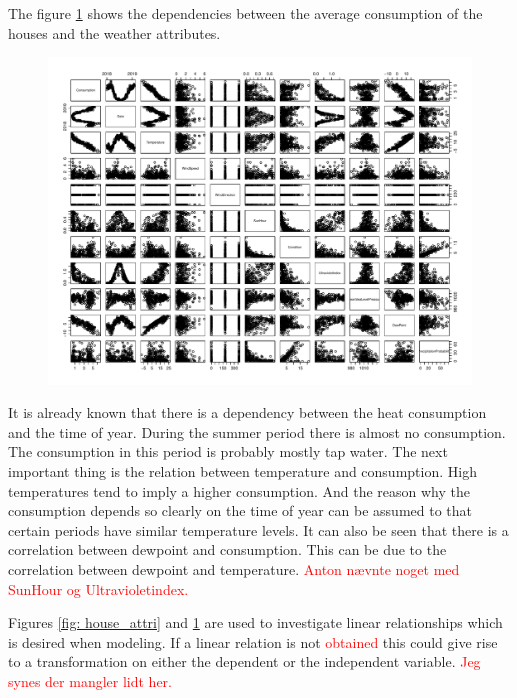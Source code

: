 \noindent The figure \ref{fig: weather_cons} shows the dependencies between the average consumption of the houses and the weather attributes.
\begin{figure}
    \centering
    \includegraphics[width=.8\textwidth]{../../../figures/weather_cons.pdf}
    \caption{}
    \label{fig: weather_cons}
\end{figure}

\noindent It is already known that there is a dependency between the heat consumption and the time of year. During the summer period there is almost no consumption. The consumption in this period is probably mostly tap water. The next important thing is the relation between temperature and consumption. High temperatures tend to imply a higher consumption. And the reason why the consumption depends so clearly on the time of year can be assumed to that certain periods have similar temperature levels. It can also be seen that there is a correlation between dewpoint and consumption. This can be due to the correlation between dewpoint and temperature. \textcolor{red}{Anton nævnte noget med SunHour og Ultravioletindex.}

Figures \ref{fig: house_attri} and \ref{fig: weather_cons} are used to investigate linear relationships which is desired when modeling. If a linear relation is not \textcolor{red}{obtained} this could give rise to a transformation on either the dependent or the independent variable. \textcolor{red}{Jeg synes der mangler lidt her.}

